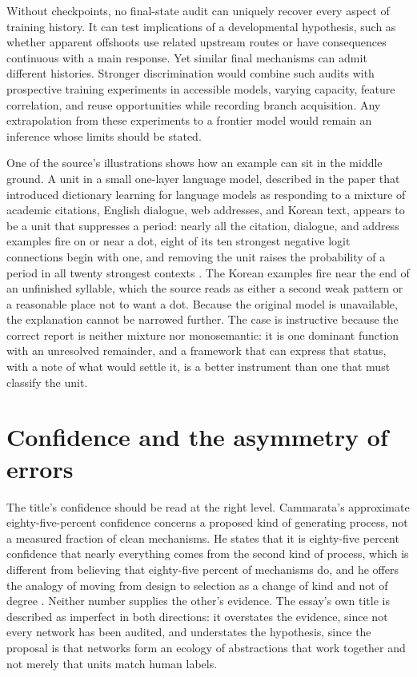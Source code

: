 \documentclass[11pt]{article}
\begin{document}
Without checkpoints, no final-state audit can uniquely recover every aspect of training history. It can test implications of a developmental hypothesis, such as whether apparent offshoots use related upstream routes or have consequences continuous with a main response. Yet similar final mechanisms can admit different histories. Stronger discrimination would combine such audits with prospective training experiments in accessible models, varying capacity, feature correlation, and reuse opportunities while recording branch acquisition. Any extrapolation from these experiments to a frontier model would remain an inference whose limits should be stated.

One of the source's illustrations shows how an example can sit in the middle ground. A unit in a small one-layer language model, described in the paper that introduced dictionary learning for language models \cite{bricken2023} as responding to a mixture of academic citations, English dialogue, web addresses, and Korean text, appears to be a unit that suppresses a period: nearly all the citation, dialogue, and address examples fire on or near a dot, eight of its ten strongest negative logit connections begin with one, and removing the unit raises the probability of a period in all twenty strongest contexts \cite[\emph{Slouching Towards Monosemanticity}]{cammarata}. The Korean examples fire near the end of an unfinished syllable, which the source reads as either a second weak pattern or a reasonable place not to want a dot. Because the original model is unavailable, the explanation cannot be narrowed further. The case is instructive because the correct report is neither mixture nor monosemantic: it is one dominant function with an unresolved remainder, and a framework that can express that status, with a note of what would settle it, is a better instrument than one that must classify the unit.

\section{Confidence and the asymmetry of errors}

The title's confidence should be read at the right level. Cammarata's approximate eighty-five-percent confidence concerns a proposed kind of generating process, not a measured fraction of clean mechanisms. He states that it is eighty-five percent confidence that nearly everything comes from the second kind of process, which is different from believing that eighty-five percent of mechanisms do, and he offers the analogy of moving from design to selection as a change of kind and not of degree \cite[\emph{On the Title}]{cammarata}. Neither number supplies the other's evidence. The essay's own title is described as imperfect in both directions: it overstates the evidence, since not every network has been audited, and understates the hypothesis, since the proposal is that networks form an ecology of abstractions that work together and not merely that units match human labels.
\end{document}
